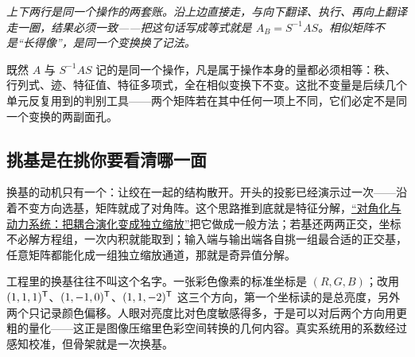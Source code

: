 \begin{center}

\emph{上下两行是同一个操作的两套账。沿上边直接走，与向下翻译、执行、再向上翻译走一圈，结果必须一致——把这句话写成等式就是 \(A_B=S^{-1}AS\)。相似矩阵不是``长得像''，是同一个变换换了记法。}
\end{center}

既然 \(A\) 与 \(S^{-1}AS\) 记的是同一个操作，凡是属于操作本身的量都必须相等：秩、行列式、迹、特征值、特征多项式，全在相似变换下不变。这批不变量是后续几个单元反复用到的判别工具——两个矩阵若在其中任何一项上不同，它们必定不是同一个变换的两副面孔。

\subsection{挑基是在挑你要看清哪一面}

换基的动机只有一个：让绞在一起的结构散开。开头的投影已经演示过一次——沿着不变方向选基，矩阵就成了对角阵。这个思路推到底就是特征分解，\hyperref[sec:03-Linear-Algebra/05-Eigenvalues-and-Eigenvectors/02]{``对角化与动力系统：把耦合演化变成独立缩放''}把它做成一般方法；若基还两两正交，坐标不必解方程组，一次内积就能取到；输入端与输出端各自挑一组最合适的正交基，任意矩阵都能化成一组独立缩放通道，那就是奇异值分解。

工程里的换基往往不叫这个名字。一张彩色像素的标准坐标是 \((R,G,B)\)；改用 \((1,1,1)^{\mathsf{T}}\)、\((1,-1,0)^{\mathsf{T}}\)、\((1,1,-2)^{\mathsf{T}}\) 这三个方向，第一个坐标读的是总亮度，另外两个只记录颜色偏移。人眼对亮度比对色度敏感得多，于是可以对后两个方向用更粗的量化——这正是图像压缩里色彩空间转换的几何内容。真实系统用的系数经过感知校准，但骨架就是一次换基。

